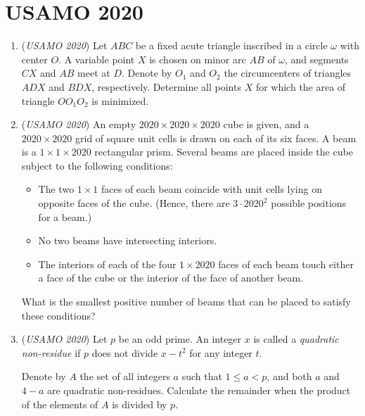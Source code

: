 \section{USAMO 2020}
        \begin{enumerate}
        	\item (\textit{USAMO 2020}) Let $ABC$ be a fixed acute triangle inscribed in a circle $\omega$ with center $O$. A variable point $X$ is chosen on minor arc $AB$ of $\omega$, and segments $CX$ and $AB$ meet at $D$. Denote by $O_1$ and $O_2$ the circumcenters of triangles $ADX$ and $BDX$, respectively. Determine all points $X$ for which the area of triangle $OO_1O_2$ is minimized.


 



 

	\item (\textit{USAMO 2020}) An empty $2020 \times 2020 \times 2020$ cube is given, and a $2020 \times 2020$ grid of square unit cells is drawn on each of its six faces. A beam is a $1 \times 1 \times 2020$ rectangular prism. Several beams are placed inside the cube subject to the following conditions:


 
            \begin{itemize}
        \item The two $1 \times 1$ faces of each beam coincide with unit cells lying on opposite faces of the cube. (Hence, there are $3 \cdot 2020^2$ possible positions for a beam.)

        \item No two beams have intersecting interiors.

        \item The interiors of each of the four $1 \times 2020$ faces of each beam touch either a face of the cube or the interior of the face of another beam.
            \end{itemize}
            What is the smallest positive number of beams that can be placed to satisfy these conditions?


 

	\item (\textit{USAMO 2020}) Let $p$ be an odd prime. An integer $x$ is called a \textit{quadratic non-residue} if $p$ does not divide $x - t^2$ for any integer $t$.


 Denote by $A$ the set of all integers $a$ such that $1 \le a < p$, and both $a$ and $4 - a$ are quadratic non-residues. Calculate the remainder when the product of the elements of $A$ is divided by $p$.



\end{enumerate}
